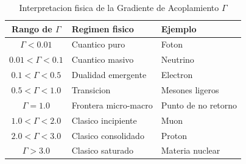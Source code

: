 \begin{table}[htbp]
\centering
\caption{Interpretacion fisica de la Gradiente de Acoplamiento $\Gamma$}
\label{tab:interpretacion}
\begin{tabular}{cll}
\toprule
Rango de $\Gamma$ & Regimen fisico & Ejemplo \\
\midrule
$\Gamma < 0.01$ & Cuantico puro & Foton \\
$0.01 < \Gamma < 0.1$ & Cuantico masivo & Neutrino \\
$0.1 < \Gamma < 0.5$ & Dualidad emergente & Electron \\
$0.5 < \Gamma < 1.0$ & Transicion & Mesones ligeros \\
$\Gamma = 1.0$ & Frontera micro-macro & Punto de no retorno \\
$1.0 < \Gamma < 2.0$ & Clasico incipiente & Muon \\
$2.0 < \Gamma < 3.0$ & Clasico consolidado & Proton \\
$\Gamma > 3.0$ & Clasico saturado & Materia nuclear \\
\bottomrule
\end{tabular}
\end{table}

